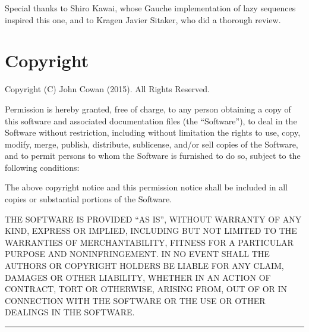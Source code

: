 Special thanks to Shiro Kawai, whose Gauche implementation of lazy
sequences inspired this one, and to Kragen Javier Sitaker, who did a
thorough review.

\section{Copyright}\label{copyright}

Copyright (C) John Cowan (2015). All Rights Reserved.

Permission is hereby granted, free of charge, to any person obtaining a
copy of this software and associated documentation files (the
``Software''), to deal in the Software without restriction, including
without limitation the rights to use, copy, modify, merge, publish,
distribute, sublicense, and/or sell copies of the Software, and to
permit persons to whom the Software is furnished to do so, subject to
the following conditions:

The above copyright notice and this permission notice shall be included
in all copies or substantial portions of the Software.

THE SOFTWARE IS PROVIDED ``AS IS'', WITHOUT WARRANTY OF ANY KIND,
EXPRESS OR IMPLIED, INCLUDING BUT NOT LIMITED TO THE WARRANTIES OF
MERCHANTABILITY, FITNESS FOR A PARTICULAR PURPOSE AND NONINFRINGEMENT.
IN NO EVENT SHALL THE AUTHORS OR COPYRIGHT HOLDERS BE LIABLE FOR ANY
CLAIM, DAMAGES OR OTHER LIABILITY, WHETHER IN AN ACTION OF CONTRACT,
TORT OR OTHERWISE, ARISING FROM, OUT OF OR IN CONNECTION WITH THE
SOFTWARE OR THE USE OR OTHER DEALINGS IN THE SOFTWARE.

\begin{center}\rule{0.5\linewidth}{\linethickness}\end{center}
